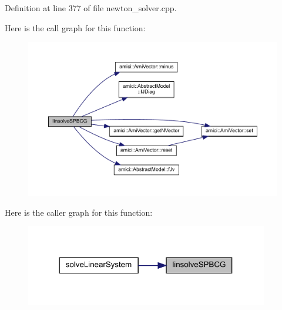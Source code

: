 Definition at line 377 of file newton\+\_\+solver.\+cpp.

Here is the call graph for this function\+:
\nopagebreak
\begin{figure}[H]
\begin{center}
\leavevmode
\includegraphics[width=350pt]{classamici_1_1_newton_solver_iterative_a89a318e506339bc8a0d05aa01920f1ae_cgraph}
\end{center}
\end{figure}
Here is the caller graph for this function\+:
\nopagebreak
\begin{figure}[H]
\begin{center}
\leavevmode
\includegraphics[width=301pt]{classamici_1_1_newton_solver_iterative_a89a318e506339bc8a0d05aa01920f1ae_icgraph}
\end{center}
\end{figure}
